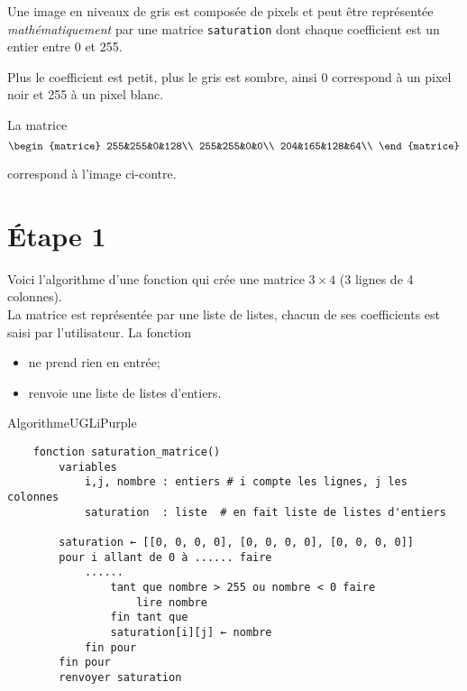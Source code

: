 \documentclass[a4paper,12pt,exos,firamath]{nsi}
\begin{document}
Une image en niveaux de gris est composée de pixels et peut être représentée \textit{mathématiquement} par une matrice  \texttt{saturation} dont chaque coefficient est un entier entre 0 et 255.

Plus le coefficient est petit, plus le gris est sombre, ainsi 0 correspond à un pixel noir et 255 à un pixel blanc.

\begin{multicols}{2}
La matrice
$$\begin{matrice}
255&255&0&128\\
255&255&0&0\\
204&165&128&64\\
\end{matrice}$$

correspond à l'image ci-contre.
\columnbreak
\begin{center}
\end{center}
\end{multicols}
\section*{\'Etape 1}

Voici l'algorithme d'une fonction qui crée une matrice $3\times 4$ (3 lignes de 4 colonnes).\\
La matrice est représentée par une liste de listes, chacun de ses coefficients est saisi par l'utilisateur. La fonction
\begin{itemize}
	\item ne prend rien en entrée;
    \item renvoie une liste de listes d'entiers.
\end{itemize}
\begin{encadrecolore}{Algorithme}{UGLiPurple}
    \small
    \begin{verbatim}    
    fonction saturation_matrice()    
        variables
            i,j, nombre : entiers # i compte les lignes, j les colonnes
            saturation  : liste  # en fait liste de listes d'entiers
    
        saturation ← [[0, 0, 0, 0], [0, 0, 0, 0], [0, 0, 0, 0]]
        pour i allant de 0 à ...... faire
            ......
                tant que nombre > 255 ou nombre < 0 faire
                    lire nombre
                fin tant que
                saturation[i][j] ← nombre
            fin pour
        fin pour
        renvoyer saturation
    \end{verbatim}
    \normalsize    
\end{encadrecolore}
\end{document}
